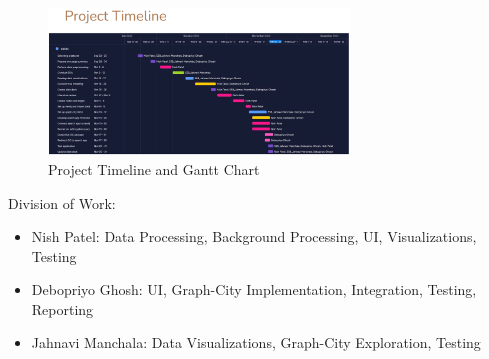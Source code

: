 \textnormal{}

\begin{figure}[htbp]
    \centering
    \includegraphics[width=8cm]{imgs/timeline.png}
    \caption{Project Timeline and Gantt Chart}
    \label{fig:timeline}
\end{figure}


Division of Work:
\begin{itemize}
\item{
Nish Patel: Data Processing, Background Processing, UI, Visualizations, Testing }
\item{
Debopriyo Ghosh: UI, Graph-City Implementation, Integration, Testing, Reporting }
\item{
Jahnavi Manchala: Data Visualizations, Graph-City Exploration, Testing}

\end{itemize}